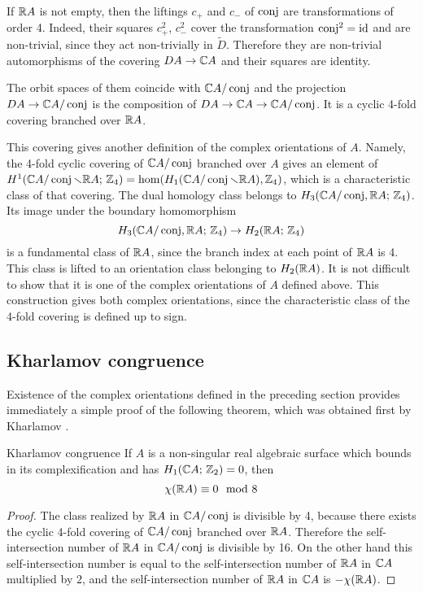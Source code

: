 \documentclass{article}
\numberwithin{equation}{section}
\begin{document}
If $\mathbb R A$ is not empty, then the liftings $c_+$ and $c_-$ of $\operatorname{conj}$ are
transformations of order 4. Indeed, their squares $c_+^2$, $c_-^2$
cover the transformation $\operatorname{conj}^2=\operatorname{id}$ and are non-trivial, since they
act non-trivially in $\tilde D$.  Therefore they are non-trivial
automorphisms of the covering $DA\to\mathbb C A$ and their squares are
identity.

The orbit spaces of them coincide with $\mathbb C A/\operatorname{conj}$ and the
projection  $DA\to\mathbb C A/\operatorname{conj}$ is the composition of
$DA\to\mathbb C A\to\mathbb C A/\operatorname{conj}$. It is a cyclic 4-fold covering branched over
$\mathbb R A$.

This covering gives another definition of the complex orientations
of $A$. Namely, the 4-fold cyclic covering of $\mathbb C A/\operatorname{conj}$ branched
over $A$ gives an element of $H^1(\mathbb C A/\operatorname{conj}\smallsetminus \mathbb R A;\,\mathbb Z_4)=
\hom(H_1(\mathbb C A/\operatorname{conj}\smallsetminus \mathbb R A),\mathbb Z_4)$, which is a characteristic
class of that covering. The dual homology class belongs to
$H_3(\mathbb C A/\operatorname{conj},\mathbb R A;\,\mathbb Z_4)$.  Its image under the
boundary homomorphism $$H_3(\mathbb C A/\operatorname{conj},\mathbb R A;\,\mathbb Z_4)\to H_2(\mathbb R A;\,\mathbb Z_4)$$
is a fundamental class of $\mathbb R A$, since the branch index at each
point of $\mathbb R A$ is 4. This class is lifted to an
orientation class belonging to $H_2(\mathbb R A)$. It is not difficult to
show that it is one of the complex orientations of $A$ defined
above. This construction gives both complex orientations, since the
characteristic class of the 4-fold covering is defined up to sign.


\subsection{Kharlamov congruence}\label{s2.3}   Existence of
the complex orientations defined in the preceding section provides
immediately a simple proof of the following theorem, which was
obtained first by Kharlamov \cite{Kh1}.

\begin{thm}{Kharlamov congruence}\label{2.3.A} If $A$ is a non-singular real
algebraic surface which bounds in its complexification and has
$H_1(\mathbb C A;\,\mathbb Z_2)=0$, then
$$
\chi(\mathbb R A)\equiv 0 \mod8
$$
\end{thm}

\begin{proof} The class realized by $\mathbb R A$ in $\mathbb C A/\operatorname{conj}$ is divisible
by 4, because there exists the cyclic 4-fold covering of $\mathbb C A/\operatorname{conj}$
branched over $\mathbb R A$. Therefore the self-intersection number of $\mathbb R A$
in $\mathbb C A/\operatorname{conj}$ is divisible by 16. On the other hand this
self-intersection number is equal to the self-intersection number
of $\mathbb R A$ in $\mathbb C A$ multiplied by $2$, and the self-intersection
number of $\mathbb R A$ in $\mathbb C A$ is $-\chi(\mathbb R A)$.  
\end{proof}
\end{document}
